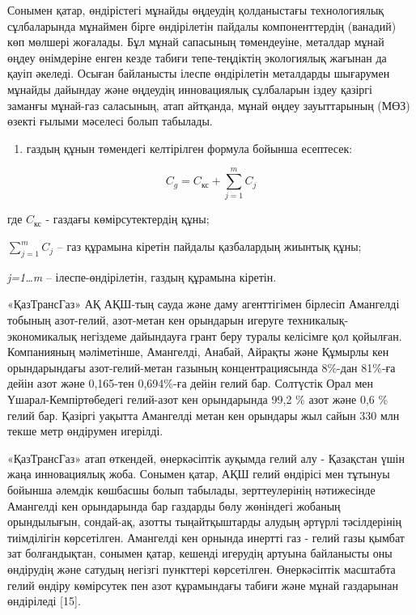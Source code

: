 \begin{multicols}{2}
Сонымен қатар, өндірістегі мұнайды өңдеудің қолданыстағы технологиялық
сұлбаларында мұнаймен бірге өндірілетін пайдалы компоненттердің
(ванадий) көп мөлшері жоғалады. Бұл мұнай сапасының төмендеуіне,
металдар мұнай өңдеу өнімдеріне енген кезде табиғи тепе-теңдіктің
экологиялық жағынан да қауіп әкеледі. Осыған байланысты ілеспе
өндірілетін металдарды шығарумен мұнайды дайындау және өңдеудің
инновациялық сұлбаларын іздеу қазіргі заманғы мұнай-газ саласының, атап
айтқанда, мұнай өңдеу зауыттарының (МӨЗ) өзекті ғылыми мәселесі болып
табылады.

\begin{enumerate}
\def\labelenumi{\arabic{enumi})}
\setcounter{enumi}{1}
\item
  газдың құнын төмендегі келтірілген формула бойынша есептесек:
\end{enumerate}
\begin{equation}
  C_g = C_{\text{кс}} + \sum_{j=1}^{m} C_j
  \end{equation}
  

где $C_{\text{кс}}$ - газдағы көмірсутектердің құны;

$\sum_{j=1}^{m} C_j$ -- газ құрамына кіретін пайдалы қазбалардың
жиынтық құны;

\emph{j=1\ldots m} -- ілеспе-өндірілетін, газдың құрамына кіретін.

«ҚазТрансГаз» АҚ АҚШ-тың сауда және даму агенттігімен бірлесіп Амангелді
тобының азот-гелий, азот-метан кен орындарын игеруге
техникалық-экономикалық негіздеме дайындауға грант беру туралы келісімге
қол қойылған. Компанияның мәліметінше, Амангелді, Анабай, Айрақты және
Құмырлы кен орындарындағы азот-гелий-метан газының концентрациясында
8\%-дан 81\%-ға дейін азот және 0,165-тен 0,694\%-ға дейін гелий бар.
Солтүстік Орал мен Үшарал-Кемпіртөбедегі гелий-азот кен орындарында 99,2
\% азот және 0,6 \% гелий бар. Қазіргі уақытта Амангелді метан кен
орындары жыл сайын 330 млн текше метр өндірумен игерілді.

«ҚазТрансГаз» атап өткендей, өнеркәсіптік ауқымда гелий алу - Қазақстан
үшін жаңа инновациялық жоба. Сонымен қатар, АҚШ гелий өндірісі мен
тұтынуы бойынша әлемдік көшбасшы болып табылады, зерттеулерінің
нәтижесінде Амангелді кен орындарында бар газдарды бөлу жөніндегі
жобаның орындылығын, сондай-ақ, азотты тыңайтқыштарды алудың әртүрлі
тәсілдерінің тиімділігін көрсетілген. Амангелді кен орнында инертті газ
- гелий газы қымбат зат болғандықтан, сонымен қатар, кешенді игерудің
артуына байланысты оны өндірудің және сатудың негізгі пункттері
көрсетілген. Өнеркәсіптік масштабта гелий өндіру көмірсутек пен азот
құрамындағы табиғи және мұнай газдарынан өндіріледі {[}15{]}.


\end{multicols}
